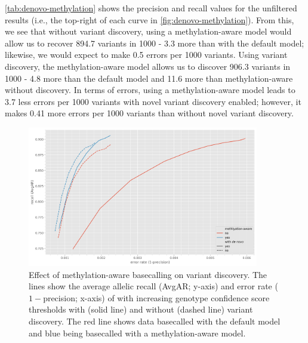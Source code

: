 \autoref{tab:denovo-methylation} shows the precision and recall values for the unfiltered results (i.e., the top-right of each curve in \autoref{fig:denovo-methylation}). From this, we see that without \denovo{} variant discovery, using a methylation-aware model would allow us to recover 894.7 variants in 1000 - 3.3 more than with the default model; likewise, we would expect to make 0.5 errors per 1000 variants. Using \denovo{} variant discovery, the methylation-aware model allows us to discover 906.3 variants in 1000 - 4.8 more than the default model and 11.6 more than methylation-aware without \denovo{} discovery. In terms of errors, using a methylation-aware model leads to 3.7 less errors per 1000 variants with novel variant discovery enabled; however, it makes 0.41 more errors per 1000 variants than without novel variant discovery. 

\begin{figure}
    \centering
    \includegraphics[width=0.9\textwidth]{Chapter1/Figs/pandora_basecaller_roc.png}
    \caption{Effect of \ont{} methylation-aware basecalling on \pandora{} \denovo{} variant discovery. The lines show the average allelic recall (AvgAR; y-axis) and error rate ($1-$precision; x-axis) of \pandora{} with increasing genotype confidence score thresholds with (solid line) and without (dashed line) \denovo{} variant discovery. The red line shows data basecalled with the default \guppy{} model and blue being basecalled with a methylation-aware model.}
    \label{fig:denovo-methylation}
\end{figure}


